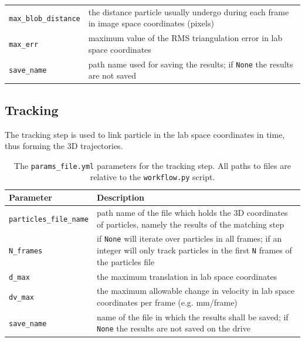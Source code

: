 \documentclass[10pt,a4paper]{article}
\begin{document}
\begin{table}[!ht]
\begin{tabular}{l m{10cm}}
		\texttt{max\_blob\_distance} &  the distance particle usually undergo during each frame in image space coordinates (pixels)\\
		
		\texttt{max\_err} & maximum value of the RMS triangulation error in lab space coordinates \\
		
		\texttt{save\_name} & path name used for saving the results; if \texttt{None} the results are not saved \\
		
		\hline
	\end{tabular}
\end{table}





\subsection{Tracking}\label{sec:workflow_track}

The tracking step is used to link particle in the lab space coordinates in time, thus forming the 3D trajectories.




\begin{table}[!ht]
	\centering
	\caption{The \texttt{params\_file.yml} parameters for the tracking step. All paths to files are relative to the \texttt{workflow.py} script.}
	\begin{tabular}{l m{10cm}}
		\hline
		Parameter & Description\\
		\hline
		
		\texttt{particles\_file\_name} & path name of the file which holds the 3D coordinates of particles, namely the results of the matching step  \\
		
		\texttt{N\_frames} & if \texttt{None} will iterate over particles in all frames; if an integer will only track particles in the first \texttt{N} frames of the particles file\\
		
		\texttt{d\_max} & the maximum translation in lab space coordinates \\
		
		\texttt{dv\_max} & the maximum allowable change in velocity in lab space coordinates per frame (e.g. mm/frame) \\
		
		\texttt{save\_name} & name of the file in which the results shall be saved; if \texttt{None} the results are not saved on the drive\\
		
		\hline
	\end{tabular}
\end{table}
\end{document}
